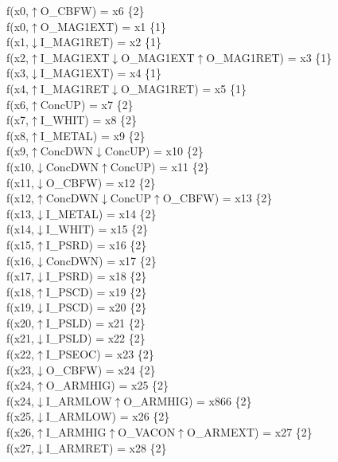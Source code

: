 f(x0,$\uparrow$O\_CBFW) = x6 \{2\} \\  
f(x0,$\uparrow$O\_MAG1EXT) = x1 \{1\} \\  
f(x1,$\downarrow$I\_MAG1RET) = x2 \{1\} \\  
f(x2,$\uparrow$I\_MAG1EXT$\downarrow$O\_MAG1EXT$\uparrow$O\_MAG1RET) = x3 \{1\} \\  
f(x3,$\downarrow$I\_MAG1EXT) = x4 \{1\} \\  
f(x4,$\uparrow$I\_MAG1RET$\downarrow$O\_MAG1RET) = x5 \{1\} \\  
f(x6,$\uparrow$ConcUP) = x7 \{2\} \\  
f(x7,$\uparrow$I\_WHIT) = x8 \{2\} \\  
f(x8,$\uparrow$I\_METAL) = x9 \{2\} \\  
f(x9,$\uparrow$ConcDWN$\downarrow$ConcUP) = x10 \{2\} \\  
f(x10,$\downarrow$ConcDWN$\uparrow$ConcUP) = x11 \{2\} \\  
f(x11,$\downarrow$O\_CBFW) = x12 \{2\} \\  
f(x12,$\uparrow$ConcDWN$\downarrow$ConcUP$\uparrow$O\_CBFW) = x13 \{2\} \\  
f(x13,$\downarrow$I\_METAL) = x14 \{2\} \\  
f(x14,$\downarrow$I\_WHIT) = x15 \{2\} \\  
f(x15,$\uparrow$I\_PSRD) = x16 \{2\} \\  
f(x16,$\downarrow$ConcDWN) = x17 \{2\} \\  
f(x17,$\downarrow$I\_PSRD) = x18 \{2\} \\  
f(x18,$\uparrow$I\_PSCD) = x19 \{2\} \\  
f(x19,$\downarrow$I\_PSCD) = x20 \{2\} \\  
f(x20,$\uparrow$I\_PSLD) = x21 \{2\} \\  
f(x21,$\downarrow$I\_PSLD) = x22 \{2\} \\  
f(x22,$\uparrow$I\_PSEOC) = x23 \{2\} \\  
f(x23,$\downarrow$O\_CBFW) = x24 \{2\} \\  
f(x24,$\uparrow$O\_ARMHIG) = x25 \{2\} \\  
f(x24,$\downarrow$I\_ARMLOW$\uparrow$O\_ARMHIG) = x866 \{2\} \\  
f(x25,$\downarrow$I\_ARMLOW) = x26 \{2\} \\  
f(x26,$\uparrow$I\_ARMHIG$\uparrow$O\_VACON$\uparrow$O\_ARMEXT) = x27 \{2\} \\  
f(x27,$\downarrow$I\_ARMRET) = x28 \{2\} \\  
